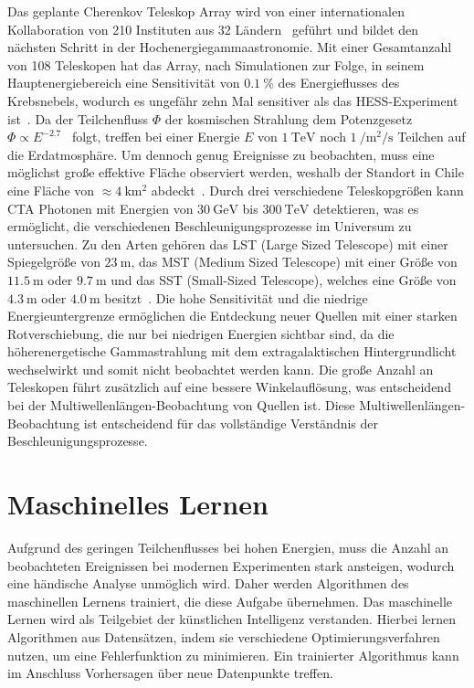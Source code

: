 Das geplante Cherenkov Teleskop Array wird von einer internationalen Kollaboration von 210 Instituten aus 32 Ländern~\cite{CTA_consortium} geführt
und bildet den nächsten Schritt in der Hochenergiegammaastronomie.
Mit einer Gesamtanzahl von 108 Teleskopen hat das Array, nach Simulationen zur Folge, in seinem Hauptenergiebereich eine Sensitivität von $\SI{0.1}{\percent}$
des Energieflusses des Krebsnebels, wodurch es ungefähr zehn Mal sensitiver als das HESS-Experiment ist~\cite{CTA_paper}.
Da der Teilchenfluss $\Phi$ der kosmischen Strahlung dem Potenzgesetz $\Phi \propto E^{-2.7}$~\cite[5]{Cosmic_rays} folgt,
treffen bei einer Energie $E$ von $\SI{1}{\tera\eV}$ noch $\SI{1}{\per\m\squared\per\s}$ Teilchen auf die Erdatmosphäre.
Um dennoch genug Ereignisse zu beobachten, muss eine möglichst große effektive Fläche observiert werden, weshalb der Standort in
Chile eine Fläche von $\approx \SI{4}{\kilo\m\squared}$ abdeckt~\cite{CTA_ob}.
Durch drei verschiedene Teleskopgrößen kann CTA Photonen mit Energien von $\SI{30}{\giga\eV}$ bis $\SI{300}{\tera\eV}$ detektieren,
was es ermöglicht, die verschiedenen Beschleunigungsprozesse im Universum zu untersuchen.
Zu den Arten gehören das LST (Large Sized Telescope) mit einer Spiegelgröße von $\SI{23}{\m}$, das MST (Medium Sized Telescope)
mit einer Größe von $\SI{11.5}{\m}$ oder $\SI{9.7}{\m}$ und das SST (Small-Sized Telescope), welches eine Größe von $\SI{4.3}{\m}$ oder $\SI{4.0}{\m}$
besitzt~\cite{CTA_tec}.
Die hohe Sensitivität und die niedrige Energieuntergrenze ermöglichen die Entdeckung neuer Quellen mit einer starken Rotverschiebung, die nur bei niedrigen
Energien sichtbar sind, da die höherenergetische Gammastrahlung mit dem extragalaktischen Hintergrundlicht wechselwirkt und somit nicht beobachtet werden kann.
Die große Anzahl an Teleskopen führt zusätzlich auf eine bessere Winkelauflösung, was entscheidend bei der Multiwellenlängen-Beobachtung von Quellen ist.
Diese Multiwellenlängen-Beobachtung ist entscheidend für das vollständige Verständnis der Beschleunigungsprozesse.

\section{Maschinelles Lernen}
\label{sec:ML}

Aufgrund des geringen Teilchenflusses bei hohen Energien, muss die Anzahl an beobachteten Ereignissen bei modernen
Experimenten stark ansteigen, wodurch eine händische Analyse unmöglich wird.
Daher werden Algorithmen des maschinellen Lernens trainiert, die diese Aufgabe übernehmen.
Das maschinelle Lernen wird als Teilgebiet der künstlichen Intelligenz verstanden. Hierbei lernen Algorithmen aus Datensätzen,
indem sie verschiedene Optimierungsverfahren nutzen, um eine Fehlerfunktion zu minimieren.
Ein trainierter Algorithmus kann im Anschluss Vorhersagen über neue Datenpunkte treffen.

